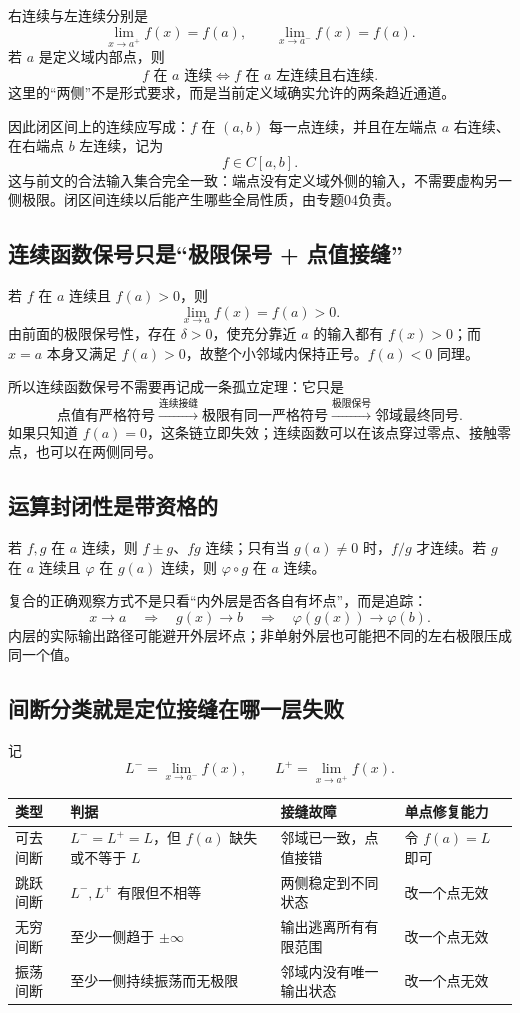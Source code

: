 \documentclass[11pt,a4paper]{ctexart}
\begin{document}
右连续与左连续分别是
\[
\lim_{x\to a^+}f(x)=f(a),
\qquad
\lim_{x\to a^-}f(x)=f(a).
\]
若 $a$ 是定义域内部点，则
\[
f\text{ 在 }a\text{ 连续}
\iff
f\text{ 在 }a\text{ 左连续且右连续}.
\]
这里的“两侧”不是形式要求，而是当前定义域确实允许的两条趋近通道。

因此闭区间上的连续应写成：$f$ 在 $(a,b)$ 每一点连续，并且在左端点 $a$ 右连续、在右端点 $b$ 左连续，记为
\[
f\in C[a,b].
\]
这与前文的合法输入集合完全一致：端点没有定义域外侧的输入，不需要虚构另一侧极限。闭区间连续以后能产生哪些全局性质，由专题04负责。

\subsection{连续函数保号只是“极限保号 + 点值接缝”}

若 $f$ 在 $a$ 连续且 $f(a)>0$，则
\[
\lim_{x\to a}f(x)=f(a)>0.
\]
由前面的极限保号性，存在 $\delta>0$，使充分靠近 $a$ 的输入都有 $f(x)>0$；而 $x=a$ 本身又满足 $f(a)>0$，故整个小邻域内保持正号。$f(a)<0$ 同理。

所以连续函数保号不需要再记成一条孤立定理：它只是
\[
\boxed{\text{点值有严格符号}\xrightarrow{\text{连续接缝}}\text{极限有同一严格符号}\xrightarrow{\text{极限保号}}\text{邻域最终同号}}.
\]
如果只知道 $f(a)=0$，这条链立即失效；连续函数可以在该点穿过零点、接触零点，也可以在两侧同号。

\subsection{运算封闭性是带资格的}

若 $f,g$ 在 $a$ 连续，则 $f\pm g$、$fg$ 连续；只有当 $g(a)\ne0$ 时，$f/g$ 才连续。若 $g$ 在 $a$ 连续且 $\varphi$ 在 $g(a)$ 连续，则 $\varphi\circ g$ 在 $a$ 连续。

复合的正确观察方式不是只看“内外层是否各自有坏点”，而是追踪：
\[
x\to a\quad\Longrightarrow\quad g(x)\to b
\quad\Longrightarrow\quad \varphi(g(x))\to\varphi(b).
\]
内层的实际输出路径可能避开外层坏点；非单射外层也可能把不同的左右极限压成同一个值。

\subsection{间断分类就是定位接缝在哪一层失败}

记
\[
L^- = \lim_{x\to a^-}f(x),\qquad
L^+ = \lim_{x\to a^+}f(x).
\]

\begin{tabularx}{\linewidth}{L{2.2cm}L{4.1cm}YY}
\toprule
\textbf{类型} & \textbf{判据} & \textbf{接缝故障} & \textbf{单点修复能力}\\
\midrule
可去间断 & $L^-=L^+=L$，但 $f(a)$ 缺失或不等于 $L$ & 邻域已一致，点值接错 & 令 $f(a)=L$ 即可\\
跳跃间断 & $L^-,L^+$ 有限但不相等 & 两侧稳定到不同状态 & 改一个点无效\\
无穷间断 & 至少一侧趋于 $\pm\infty$ & 输出逃离所有有限范围 & 改一个点无效\\
振荡间断 & 至少一侧持续振荡而无极限 & 邻域内没有唯一输出状态 & 改一个点无效\\
\bottomrule
\end{tabularx}
\end{document}

